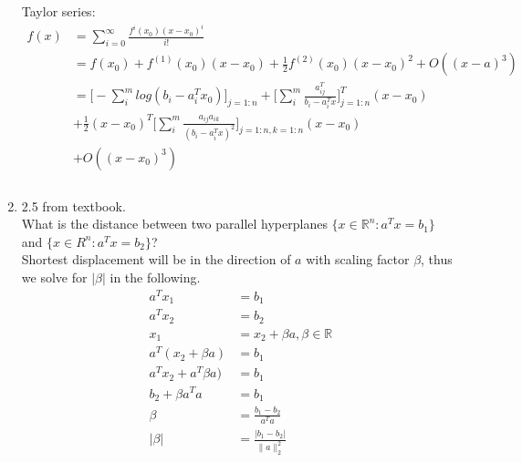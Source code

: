 \documentclass[12pt,letter]{article}
\newcommand{\R}{\mathbb{R}}
\newcommand{\norm}[1]{\|#1\|}
\begin{document}
\begin{enumerate}
  Taylor series:
  \begin{align*}
    f(x) &= \sum_{i=0}^{\infty} \frac{f^i(x_0)(x-x_0)^i}{i!}\\
                      &=f(x_0)+f^{(1)}(x_0)(x-x_0)+\frac{1}{2}f^{(2)}(x_0)(x-x_0)^2+O((x-a)^3)\\
                      &=\bigg[-\sum_i^m log(b_i-a_i^Tx_0)\bigg]_{j=1:n} +
                        \bigg[\sum_i^m \frac{a_{ij}^T}{b_i-a_i^T x}\bigg]_{j=1:n}^T (x-x_0)\\
         & + \frac{1}{2} (x-x_0)^T \bigg[\sum_i^m \frac{a_{ij}a_{ik}}{(b_i-a_i^T x)^2}\bigg]_{j=1:n,k=1:n} (x-x_0)\\ & + O((x-x_0)^3)\\
    \\
  \end{align*}
  \pagebreak
  
\item 2.5 from textbook.\\
  What is the distance between two parallel hyperplanes $\{x \in \R^n : a^Tx = b_1 \}$ and $\{x \in R^n : a^T x = b_2 \}$?\\
  Shortest displacement will be in the direction of $a$ with scaling factor $\beta$, thus we solve for $|\beta|$ in the following.
  \begin{align*}
    a^T x_1 &= b_1\\
    a^T x_2 &= b_2\\
    x_1 &= x_2 + \beta a, \beta \in \R\\
    a^T (x_2+\beta a) &= b_1\\
    a^T x_2+ a^T \beta a) &= b_1\\
    b_2 + \beta a^T a &= b_1\\
    \beta &= \frac{b_1-b_2}{a^T a}\\
    |\beta| &= \frac{|b_1-b_2|}{\norm{a}_2^2}\\
  \end{align*}
  

\end{enumerate}
\end{document}
